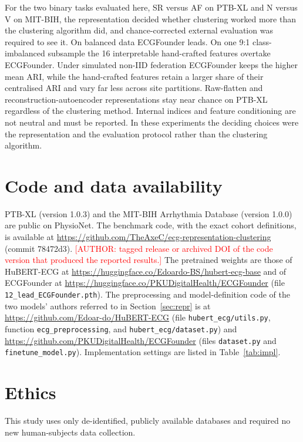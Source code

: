 \documentclass[preprint,11pt]{elsarticle}
\begin{document}
For the two binary tasks evaluated here, SR versus AF on PTB-XL and N versus V on
MIT-BIH, the representation decided whether clustering worked more than the clustering
algorithm did, and chance-corrected external evaluation was required to see it. On
balanced data ECGFounder leads. On one 9:1 class-imbalanced subsample the 16
interpretable hand-crafted features overtake ECGFounder. Under simulated non-IID
federation ECGFounder
keeps the higher mean ARI, while the hand-crafted features retain a larger share of their
centralised ARI and vary far less across site partitions. Raw-flatten and
reconstruction-autoencoder representations stay near chance on PTB-XL regardless of the
clustering method. Internal indices and feature conditioning are not neutral and must be
reported. In these experiments the deciding choices were the representation and the
evaluation protocol rather than the clustering algorithm.

\section*{Code and data availability}
PTB-XL (version 1.0.3) \cite{ptbxl2020,ptbxl2022physionet} and the MIT-BIH Arrhythmia Database (version 1.0.0) \cite{mitbih2001,mitbih2005physionet} are public
on PhysioNet. The benchmark code, with the exact cohort
definitions, is available at \url{https://github.com/TheAxeC/ecg-representation-clustering}
(commit 78472d3). \textcolor{red}{[AUTHOR: tagged release or archived DOI of the code
version that produced the reported results.]} The pretrained weights are those of
HuBERT-ECG at \url{https://huggingface.co/Edoardo-BS/hubert-ecg-base} and of ECGFounder
at \url{https://huggingface.co/PKUDigitalHealth/ECGFounder} (file
\texttt{12\_lead\_ECGFounder.pth}). The preprocessing and model-definition code of the
two models' authors referred to in Section~\ref{sec:repr} is at
\url{https://github.com/Edoar-do/HuBERT-ECG} (file \texttt{hubert\_ecg/utils.py},
function \texttt{ecg\_preprocessing}, and \texttt{hubert\_ecg/dataset.py}) and
\url{https://github.com/PKUDigitalHealth/ECGFounder} (files \texttt{dataset.py} and
\texttt{finetune\_model.py}). Implementation settings are listed in Table~\ref{tab:impl}.

\section*{Ethics}
This study uses only de-identified, publicly available databases and required no new
human-subjects data collection.
\end{document}

